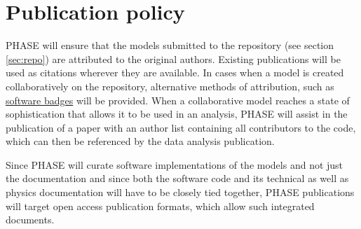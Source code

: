 \section{Publication policy}
\label{sec:publications}
PHASE will ensure that the models submitted to the repository (see section \ref{sec:repo}) are attributed to the original authors. Existing publications will be used as citations wherever they are available. In cases when a model is created collaboratively on the repository, alternative methods of attribution, such as \href{http://openbadges.org}{software badges} will be provided. When a collaborative model reaches a state of sophistication that allows it to be used in an analysis, PHASE will assist in the publication of a paper with an author list containing all contributors to the code, which can then be referenced by the data analysis publication.

Since PHASE will curate software implementations of the models and not just the documentation and since both the software code and its technical as well as physics documentation will have to be closely tied together, PHASE publications will target open access publication formats, which allow such integrated documents.